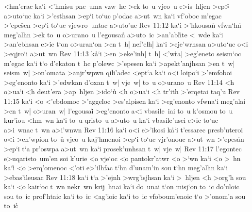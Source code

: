 <hm'erac
ka`i
<'hmisu
pne~uma
vzw~hc
>ek
to~u
vjeo~u
e>is~hljen
>ep>\r{}
a>uto`uc
ka`i
>'esthsan
>ep`i
to`uc
p'odac
a>ut~wn
ka`i
vf'oboc
m'egac
>'epe\r{s}en
>ep`i
to`uc
vjewro~untac
a>uto'uc\bibvsend
\vs Rev 11:12
ka`i
>'hkousa\r{n}
vfwn`hn\r{}
meg'alhn
>ek
to~u
o>urano~u
l'egousa\r{n}
a>uto~ic
>an'ab\r{h}te
<~wde
ka`i
>an'ebhsan
e>ic
t`on
o>uran`on
>en
t~h|
nef'elh|
ka`i
>eje'wrhsan
a>uto`uc
o<i
>eqjro`i
a>ut~wn\bibvsend
\vs Rev 11:13
k\r{a}`i
>en
>eke'inh|
t~h|
<'w\r{r}a|
>eg'eneto
seism`oc
m'egac
ka`i
t`o
d'ekaton
t~hc
p'olewc
>'epesen
ka`i
>apekt'anjhsan
>en
t~w|
seism~w|
>on'omata
>anjr'wpwn
qili'adec
<ept`a
ka`i
o<i
loipo`i
>'emfoboi
>eg'enonto
ka`i
>'edwkan
d'oxan
t~w|
vje~w|
to~u
o>urano~u\bibvsend
\vs Rev 11:14
<h
o>ua`i
<h
deut'era
>ap~hljen
>ido`u\r{}
<h
o>ua`i
<h
tr'ith
>'erqetai
taq'u\bibvsend
\vs Rev 11:15
ka`i
<o
<'ebdomoc
>'aggeloc
>es'alpisen
ka`i
>eg'enonto
vfwna`i
meg'alai
>en
t~w|
o>uran~w|
l'egousai\r{}
>eg'enonto
a<i
vbasile~iai
to~u
k'osmou
to~u
kur'iou
<hm~wn
ka`i
to~u
qristo~u
a>uto~u
ka`i
vbasile'usei
e>ic
to`uc
a>i~wnac
t~wn
a>i'wnwn\bibvsend
\vs Rev 11:16
ka`i
o<i
e>'ikosi
k\r{a}`i
t'essarec
presb'uteroi
o<i
>en'wpion
to~u\r{}
vjeo~u
kaj'hmenoi
>ep`i
to`uc
vjr'onouc
a>ut~wn
>'epes\r{a}n
>ep`i
t`a
pr'oswpa
a>ut~wn
ka`i
prosek'unhsan
t~w|
vje~w|\bibvsend
\vs Rev 11:17
l'egontec
e>uqaristo~um'en
soi
k'urie
<o
vje`oc
<o
pantokr'atwr
<o
>`wn
ka`i
<o
>~hn
ka`i\r{}
<o
>erq'omenoc
<'oti
e>'ilhfac
t`hn
d'unam'in
sou
t`hn
meg'alhn
ka`i
>ebas'ileusac\bibvsend
\vs Rev 11:18
ka`i
t`a
>'ejnh
>wrg'isjhsan
ka`i
>~hljen
<h
>org'h
sou
ka`i
<o
kair`oc
t~wn
nekr~wn
krij~hnai
ka`i
do~unai
t`on
misj`on
to~ic
do'uloic
sou
to~ic
prof'htaic
ka`i
to~ic
<ag'ioic
ka`i
to~ic
vfoboum'enoic
t`o
>'onom'a
sou
to~ic\r{}
